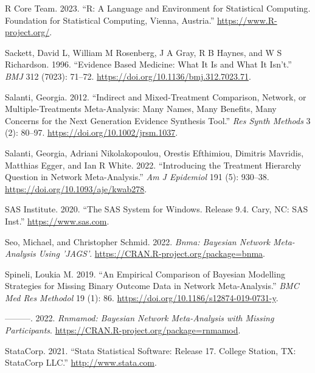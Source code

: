 \begin{CSLReferences}{1}{0}
\leavevmode{}%
R Core Team. 2023. {``{R: A Language and Environment for Statistical Computing}. Foundation for Statistical Computing, Vienna, Austria.''} \url{https://www.R-project.org/}.

\leavevmode{}%
Sackett, David L, William M Rosenberg, J A Gray, R B Haynes, and W S Richardson. 1996. {``Evidence Based Medicine: What It Is and What It Isn't.''} \emph{BMJ} 312 (7023): 71--72. \url{https://doi.org/10.1136/bmj.312.7023.71}.

\leavevmode{}%
Salanti, Georgia. 2012. {``Indirect and Mixed-Treatment Comparison, Network, or Multiple-Treatments Meta-Analysis: Many Names, Many Benefits, Many Concerns for the Next Generation Evidence Synthesis Tool.''} \emph{Res Synth Methods} 3 (2): 80--97. \url{https://doi.org/10.1002/jrsm.1037}.

\leavevmode{}%
Salanti, Georgia, Adriani Nikolakopoulou, Orestis Efthimiou, Dimitris Mavridis, Matthias Egger, and Ian R White. 2022. {``Introducing the Treatment Hierarchy Question in Network Meta-Analysis.''} \emph{Am J Epidemiol} 191 (5): 930--38. \url{https://doi.org/10.1093/aje/kwab278}.

\leavevmode{}%
SAS Institute. 2020. {``{The SAS System for Windows}. Release 9.4. Cary, NC: SAS Inst.''} \url{https://www.sas.com}.

\leavevmode{}%
Seo, Michael, and Christopher Schmid. 2022. \emph{Bnma: Bayesian Network Meta-Analysis Using 'JAGS'}. \url{https://CRAN.R-project.org/package=bnma}.

\leavevmode{}%
Spineli, Loukia M. 2019. {``An Empirical Comparison of Bayesian Modelling Strategies for Missing Binary Outcome Data in Network Meta-Analysis.''} \emph{BMC Med Res Methodol} 19 (1): 86. \url{https://doi.org/10.1186/s12874-019-0731-y}.

\leavevmode{}%
---------. 2022. \emph{Rnmamod: Bayesian Network Meta-Analysis with Missing Participants}. \url{https://CRAN.R-project.org/package=rnmamod}.

\leavevmode{}%
StataCorp. 2021. {``{Stata Statistical Software: Release 17}. College Station, TX: StataCorp LLC.''} \url{http://www.stata.com}.


\end{CSLReferences}

